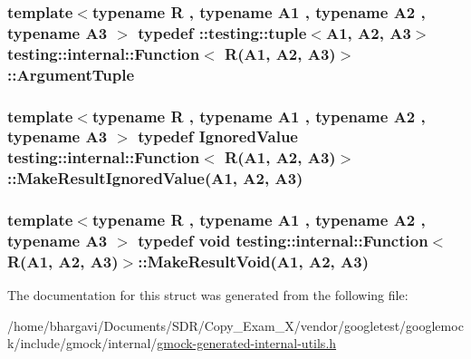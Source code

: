 \subsubsection[{\texorpdfstring{Argument\+Tuple}{ArgumentTuple}}]{\setlength{\rightskip}{0pt plus 5cm}template$<$typename R , typename A1 , typename A2 , typename A3 $>$ typedef \+::testing\+::tuple$<$A1, A2, A3$>$ {\bf testing\+::internal\+::\+Function}$<$ R(A1, A2, A3)$>$\+::{\bf Argument\+Tuple}}\hypertarget{structtesting_1_1internal_1_1_function_3_01_r_07_a1_00_01_a2_00_01_a3_08_4_a6f1e1097947a9e13a4e29099a61de804}{}\label{structtesting_1_1internal_1_1_function_3_01_r_07_a1_00_01_a2_00_01_a3_08_4_a6f1e1097947a9e13a4e29099a61de804}
\subsubsection[{\texorpdfstring{Make\+Result\+Ignored\+Value}{MakeResultIgnoredValue}}]{\setlength{\rightskip}{0pt plus 5cm}template$<$typename R , typename A1 , typename A2 , typename A3 $>$ typedef {\bf Ignored\+Value} {\bf testing\+::internal\+::\+Function}$<$ R(A1, A2, A3)$>$\+::Make\+Result\+Ignored\+Value(A1, A2, A3)}\hypertarget{structtesting_1_1internal_1_1_function_3_01_r_07_a1_00_01_a2_00_01_a3_08_4_abff7468ae8231766e7b396c8a407cb5a}{}\label{structtesting_1_1internal_1_1_function_3_01_r_07_a1_00_01_a2_00_01_a3_08_4_abff7468ae8231766e7b396c8a407cb5a}
\subsubsection[{\texorpdfstring{Make\+Result\+Void}{MakeResultVoid}}]{\setlength{\rightskip}{0pt plus 5cm}template$<$typename R , typename A1 , typename A2 , typename A3 $>$ typedef void {\bf testing\+::internal\+::\+Function}$<$ R(A1, A2, A3)$>$\+::Make\+Result\+Void(A1, A2, A3)}\hypertarget{structtesting_1_1internal_1_1_function_3_01_r_07_a1_00_01_a2_00_01_a3_08_4_a6b9f583a9ef6755cc92ce2b7fa255b84}{}\label{structtesting_1_1internal_1_1_function_3_01_r_07_a1_00_01_a2_00_01_a3_08_4_a6b9f583a9ef6755cc92ce2b7fa255b84}


The documentation for this struct was generated from the following file\+:\begin{DoxyCompactItemize}
\item 
/home/bhargavi/\+Documents/\+S\+D\+R/\+Copy\+\_\+\+Exam\+\_\+X/vendor/googletest/googlemock/include/gmock/internal/\hyperlink{gmock-generated-internal-utils_8h}{gmock-\/generated-\/internal-\/utils.\+h}\end{DoxyCompactItemize}
